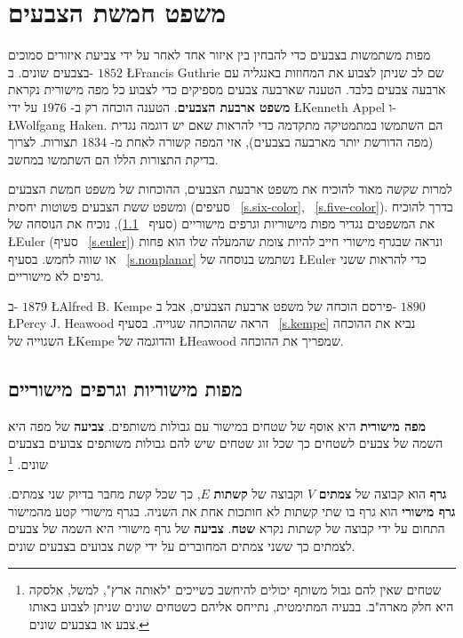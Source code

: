 


\chapter{משפט חמשת הצבעים}
\label{c.five}

מפות משתמשות בצבעים כדי להבחין בין איזור אחד לאחר על ידי צביעת איזורים סמוכים בצבעים שונים. ב-%
$1852$
\L{Francis Guthrie}
שם לב שניתן לצבוע את המחוזות באנגליה עם ארבעה צבעים בלבד. הטענה שארבעה צבעים מספיקים כדי לצבוע כל מפה מישורית נקראת 
\textbf{משפט ארבעת הצבעים}.
הטענה הוכחה רק ב-%
$1976$
על ידי
\L{Kenneth Appel}
ו-%
\L{Wolfgang Haken}.
הם השתמשו במתמטיקה מתקדמה כדי להראות שאם יש דוגמה נגדית (מפה הדורשת יותר מארבעה בצבעים), אזי המפה קשורה לאחת מ-%
$1834$
תצורות. לצרוך בדיקת התצורות הללו הם השתמשו במחשב.

למרות שקשה מאוד להוכיח את משפט ארבעת הצבעים, ההוכחות של משפט חמשת הצבעים ומשפט ששת הצבעים פשוטות יחסית (סעיפים%
~\ref{s.six-color}, ~\ref{s.five-color}).
בדרך להוכיח את המשפטים נגדיר מפות מישוריות וגרפים מישוריים (סעיף%
~\ref{s.planar}),
נוכיח את הנוסחה של
\L{Euler}
(סעיף%
~\ref{s.euler})
ונראה שבגרף מישורי חייב להיות צומת שהמעלה שלו הוא פחות או שווה לחמש. בסעיף%
~\ref{s.nonplanar}
נשתמש בנוסחה של
\L{Euler}
כדי להראות ששני גרפים לא מישוריים.

ב-%
$1879$
\L{Alfred B. Kempe}
פירסם הוכחה של משפט ארבעת הצבעים, אבל ב-%
$1890$
\L{Percy J. Heawood}
הראה שההוכחה שגוייה. בסעיף%
~\ref{s.kempe}
נביא את ההוכחה השגוייה של 
\L{Kempe}
והדוגמה של
\L{Heawood}
שמפריך את ההוכחה.


\section{מפות מישוריות וגרפים מישוריים}\label{s.planar}

\begin{definition}
\textbf{מפה מישורית}
היא אוסף של שטחים במישור עם גבולות משותפים.
\textbf{צביעה}
של מפה היא השמה של צבעים לשטחים כך שכל זוג שטחים שיש להם גבולות  משותפים צבועים בצבעים שונים.%
\footnote{%
שטחים שאין להם גבול משותף יכולים להיחשב כשייכים "לאותה ארץ", למשל, אלסקה היא חלק מארה"ב. בבעיה המתימטית, נתייחס אליהם  כשטחים שונים שניתן לצבוע באותו צבע או בצבעים שונים.%
}
\end{definition}

\begin{definition}
\textbf{גרף}
הוא קבוצה של 
\textbf{צמתים}
$V$
וקבוצה של 
\textbf{קשתות}
$E$,
כך שכל קשת מחבר בדיוק שני צמתים.
\textbf{גרף מישורי}
הוא גרף בו שתי קשתות לא חותכות אחת את השניה. בגרף מישורי קטע מהמישור התחום על ידי קבוצה של קשתות נקרא 
\textbf{שטח}.
\textbf{צביעה}
של גרף מישורי היא השמה של צבעים לצמתים כך ששני צמתים המחוברים על ידי קשת צבועים בצבעים שונים.
\end{definition}

